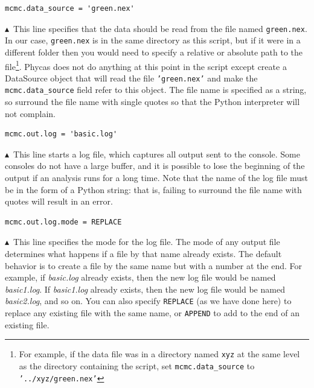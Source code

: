 \documentclass[10pt]{article}
\newcommand{\pathname}[1]{{\em #1}}				%
\newcommand{\code}[1]{{\tt #1}}					%
\newcommand{\opt}[2]{{\tt \small #1.#2}\index{#1!#2}}	%
\newcommand{\pointup}{$\blacktriangle$}
\begin{document}
\begin{samepage}
\begin{verbatim}
mcmc.data_source = 'green.nex'
\end{verbatim}
\pointup\ This line specifies that the data should be read from the file named \code{green.nex}. In our case, \code{green.nex} is in the same directory as this script, but if it were in a different folder then you would need to specify a relative or absolute path to the file\footnote{
%
For example, if the data file was in a directory named \code{xyz} at the same level as the directory containing the script, set \opt{mcmc}{data\_source} to \code{'../xyz/green.nex'} }.
%
Phycas does not do anything at this point in the script except create a DataSource object that will read the file \code{'green.nex'} and make the \opt{mcmc}{data\_source} field refer to this object. The file name is specified as a string, so surround the file name with single quotes so that the Python interpreter will not complain. 

\end{samepage}

\begin{samepage}
\begin{verbatim}
mcmc.out.log = 'basic.log'
\end{verbatim}
\pointup\ This line starts a log file, which captures all output sent to the console. Some consoles do not have a large buffer, and it is possible to lose the beginning of the output if an analysis runs for a long time. Note that the name of the log file must be in the form of a Python string: that is, failing to surround the file name with quotes will result in an error.
\end{samepage}

\begin{samepage}
\begin{verbatim}
mcmc.out.log.mode = REPLACE
\end{verbatim}
\pointup\ This line specifies the mode for the log file. The mode of any output file determines what happens if a file by that name already exists. The default behavior is to create a file by the same name but with a number at the end. For example, if \pathname{basic.log} already exists, then the new log file would be named \pathname{basic1.log}. If \pathname{basic1.log} already exists, then the new log file would be named \pathname{basic2.log}, and so on. You can also specify \code{REPLACE} (as we have done here) to replace any existing file with the same name, or \code{APPEND} to add to the end of an existing file. 
\end{samepage}
\end{document}
